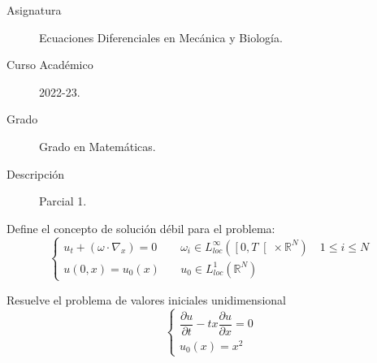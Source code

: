 \documentclass[12pt]{article}
\newcommand{\R}{\mathbb{R}}
\begin{document}

    
    

    \begin{description}
        \item[Asignatura] Ecuaciones Diferenciales en Mecánica y Biología.
        \item[Curso Académico] 2022-23.
        \item[Grado] Grado en Matemáticas.
        \item[Descripción] Parcial 1. 
    \end{description}
    \newpage



    \begin{ejercicio}
        Define el concepto de solución débil para el problema:
        \begin{equation*}
            \begin{cases}
                u_t + (\omega \cdot \nabla_x) = 0 \quad& \omega_i \in L_{loc}^{\infty}(\left[0,T\right[ \times \R^N) \quad 1 \leq i \leq N \\
                u(0,x) = u_0(x) \quad& u_0 \in L_{loc}^1(\R^N)
            \end{cases}
        \end{equation*}
    \end{ejercicio}

    \begin{ejercicio}
        Resuelve el problema de valores iniciales unidimensional 
        \begin{equation*}
            \begin{cases}
                \dfrac{\partial u}{\partial t} - tx \dfrac{\partial u}{\partial x} = 0 \\
                u_0(x) = x^2
            \end{cases}
        \end{equation*}
    \end{ejercicio}
\end{document}
